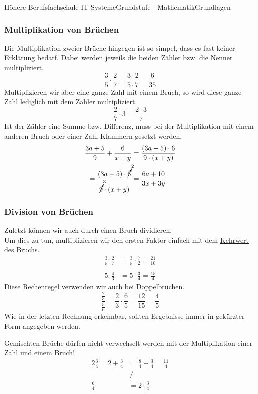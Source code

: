 \documentclass[11pt,twocolumn,oneside,openany,headings=optiontotoc,11pt,numbers=noenddot]{article}
\begin{document}
\begin{worksheet}{Höhere Berufsfachschule IT-Systeme}{Grundstufe - Mathematik}{Grundlagen}
		\subsubsection*{Multiplikation von Brüchen}
		Die Multiplikation zweier Brüche hingegen ist so simpel, dass es fast keiner Erklärung bedarf. Dabei werden jeweils die beiden Zähler bzw. die Nenner multipliziert.
		\[\frac{3}{5}\cdot{}\frac{2}{7} = \frac{3\cdot{}2}{5\cdot{}7} = \frac{6}{35}\]
		Multiplizieren wir aber eine ganze Zahl mit einem Bruch, so wird diese ganze Zahl lediglich mit dem Zähler multipliziert.
		\[\frac{2}{7}\cdot{}3 = \frac{2\cdot{}3}{7}\]
		\normalcolor{} Ist der Zähler eine Summe bzw. Differenz, muss bei der Multiplikation mit einem anderen Bruch oder einer Zahl Klammern gesetzt werden.
		\begin{align*}
			\frac{3a + 5}{9} + \frac{6}{x+y} & = \frac{(3a+5)\cdot{}6}{9\cdot{}(x+y)}\\
			= \frac{(3a+5)\cdot{}\cancelto{2}{6}}{\cancelto{3}{9}\cdot{}(x+y)} & = \frac{6a+10}{3x+3y}
		\end{align*}
		\subsubsection*{Division von Brüchen}
		Zuletzt können wir auch durch einen Bruch dividieren.\\
		Um dies zu tun, multiplizieren wir den ersten Faktor einfach mit dem \underline{Kehrwert} des Bruchs.
		\begin{align*}
			\frac{3}{5}:\frac{2}{7} & = \frac{3}{5}\cdot{}\frac{7}{2} = \frac{21}{10}\\
			\\
			5:\frac{4}{3} & = 5\cdot{}\frac{3}{4} = \frac{15}{4}
		\end{align*}
		Diese Rechenregel verwenden wir auch bei Doppelbrüchen.
		\[\frac{\frac{2}{3}}{\frac{5}{6}} = \frac{2}{3}\cdot{}\frac{6}{5} = \frac{12}{15} = \frac{4}{5}\]
		Wie in der letzten Rechnung erkennbar, sollten Ergebnisse immer in gekürzter Form angegeben werden.\\
		\par\noindent
		\normalcolor{} Gemischten Brüche dürfen nicht verwechselt werden mit der Multiplikation einer Zahl und einem Bruch!
		\begin{align*}
			2\frac{3}{4} = 2 + \frac{3}{4} & = \frac{8}{4} +\frac{3}{4} = \frac{11}{4}\\
			& \neq\\
			\frac{6}{4} & = 2\cdot{}\frac{3}{4}
		\end{align*}

\end{worksheet}
\end{document}
